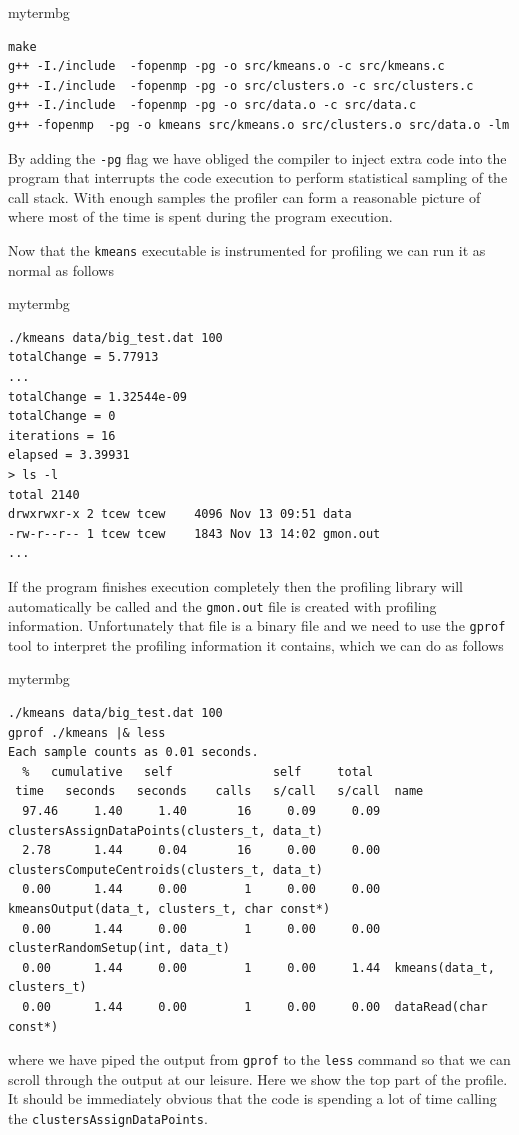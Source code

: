 \begin{tsession}{mytermbg}
\begin{Verbatim}
make 
g++ -I./include  -fopenmp -pg -o src/kmeans.o -c src/kmeans.c 
g++ -I./include  -fopenmp -pg -o src/clusters.o -c src/clusters.c  
g++ -I./include  -fopenmp -pg -o src/data.o -c src/data.c  
g++ -fopenmp  -pg -o kmeans src/kmeans.o src/clusters.o src/data.o -lm 
\end{Verbatim}
\end{tsession} 

By adding the \texttt{-pg} flag we have obliged the compiler to inject extra code into the program that interrupts the code execution to perform statistical sampling of the call stack. With enough samples the profiler can form a reasonable picture of where most of the time is spent during the program execution.

Now that the \texttt{kmeans} executable is instrumented for profiling we can run it as normal as follows

\begin{tsession}{mytermbg}
\begin{Verbatim}
./kmeans data/big_test.dat 100
totalChange = 5.77913
...
totalChange = 1.32544e-09
totalChange = 0
iterations = 16
elapsed = 3.39931
> ls -l
total 2140
drwxrwxr-x 2 tcew tcew    4096 Nov 13 09:51 data
-rw-r--r-- 1 tcew tcew    1843 Nov 13 14:02 gmon.out
...
\end{Verbatim}
\end{tsession} 

If the program finishes execution completely then the profiling library will automatically be called and the \texttt{gmon.out} file is created with profiling information. Unfortunately that file is a binary file and we need to use the \texttt{gprof} tool to interpret the profiling information it contains, which we can do as follows

\begin{tsession}{mytermbg}
\begin{Verbatim}
./kmeans data/big_test.dat 100
gprof ./kmeans |& less
Each sample counts as 0.01 seconds.
  %   cumulative   self              self     total           
 time   seconds   seconds    calls   s/call   s/call  name 
  97.46     1.40     1.40       16     0.09     0.09  clustersAssignDataPoints(clusters_t, data_t)
  2.78      1.44     0.04       16     0.00     0.00  clustersComputeCentroids(clusters_t, data_t)
  0.00      1.44     0.00        1     0.00     0.00  kmeansOutput(data_t, clusters_t, char const*)
  0.00      1.44     0.00        1     0.00     0.00  clusterRandomSetup(int, data_t)
  0.00      1.44     0.00        1     0.00     1.44  kmeans(data_t, clusters_t)
  0.00      1.44     0.00        1     0.00     0.00  dataRead(char const*)
\end{Verbatim}
\end{tsession} 
where we have piped the output from \texttt{gprof} to the \texttt{less} command so that we can scroll through the output at our leisure. Here we show the top part of the profile. It should be immediately obvious that the code is spending a lot of time calling the \texttt{clustersAssignDataPoints}. 

